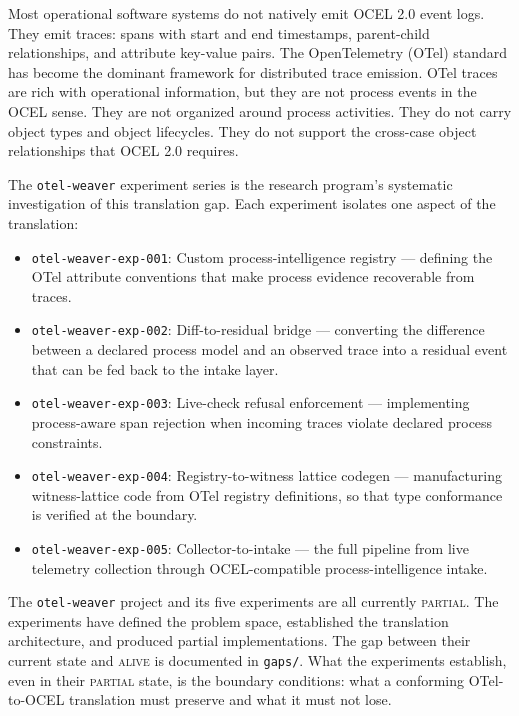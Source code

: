 Most operational software systems do not natively emit OCEL 2.0 event logs. They emit traces: spans with start and end timestamps, parent-child relationships, and attribute key-value pairs. The OpenTelemetry (OTel) standard has become the dominant framework for distributed trace emission. OTel traces are rich with operational information, but they are not process events in the OCEL sense. They are not organized around process activities. They do not carry object types and object lifecycles. They do not support the cross-case object relationships that OCEL 2.0 requires.

The \texttt{otel-weaver} experiment series is the research program's systematic investigation of this translation gap. Each experiment isolates one aspect of the translation:

\begin{itemize}
  \item \texttt{otel-weaver-exp-001}: Custom process-intelligence registry --- defining the OTel attribute conventions that make process evidence recoverable from traces.
  \item \texttt{otel-weaver-exp-002}: Diff-to-residual bridge --- converting the difference between a declared process model and an observed trace into a residual event that can be fed back to the intake layer.
  \item \texttt{otel-weaver-exp-003}: Live-check refusal enforcement --- implementing process-aware span rejection when incoming traces violate declared process constraints.
  \item \texttt{otel-weaver-exp-004}: Registry-to-witness lattice codegen --- manufacturing witness-lattice code from OTel registry definitions, so that type conformance is verified at the boundary.
  \item \texttt{otel-weaver-exp-005}: Collector-to-intake --- the full pipeline from live telemetry collection through OCEL-compatible process-intelligence intake.
\end{itemize}

The \texttt{otel-weaver} project and its five experiments are all currently \textsc{partial}. The experiments have defined the problem space, established the translation architecture, and produced partial implementations. The gap between their current state and \textsc{alive} is documented in \texttt{gaps/}. What the experiments establish, even in their \textsc{partial} state, is the boundary conditions: what a conforming OTel-to-OCEL translation must preserve and what it must not lose.

